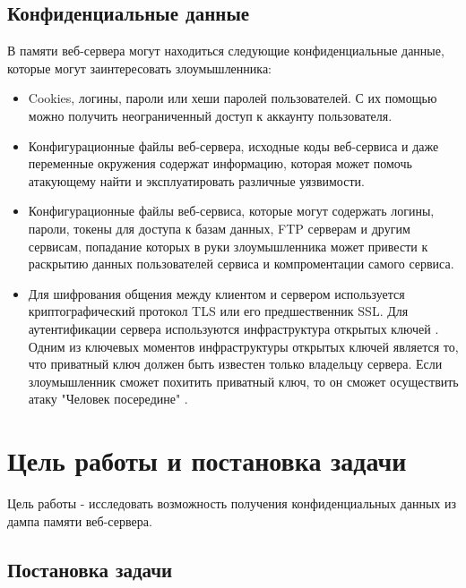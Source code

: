 \documentclass[20pt]{article}
\begin{document}
\subsection{Конфиденциальные данные}

В памяти веб-сервера могут находиться следующие конфиденциальные данные, которые
могут заинтересовать злоумышленника:

\begin{itemize}

  \item Cookies, логины, пароли или хеши паролей пользователей. С их
  помощью можно получить неограниченный доступ к аккаунту пользователя.

  \item Конфигурационные файлы веб-сервера, исходные коды веб-сервиса и даже переменные
  окружения содержат информацию, которая может помочь атакующему найти и
  эксплуатировать различные уязвимости.

  \item Конфигурационные файлы веб-сервиса, которые могут содержать логины,
  пароли, токены для доступа к базам данных, FTP серверам и другим сервисам,
  попадание которых в руки злоумышленника может привести к раскрытию данных
  пользователей сервиса и компроментации самого сервиса.

  \item Для шифрования общения между клиентом и сервером используется криптографический
  протокол TLS \cite{tls} или его предшественник SSL. Для аутентификации сервера
  используются инфраструктура открытых ключей \cite{pki}. Одним из ключевых моментов
  инфраструктуры открытых ключей является то, что приватный ключ должен быть
  известен только владельцу сервера. Если злоумышленник сможет похитить приватный
  ключ, то он сможет осуществить атаку "Человек посередине" \cite{mitm}.

\end{itemize}

\newpage

\section{Цель работы и постановка задачи}

Цель работы - исследовать возможность получения конфиденциальных данных из
дампа памяти веб-сервера.

\subsection{Постановка задачи}
\end{document}
